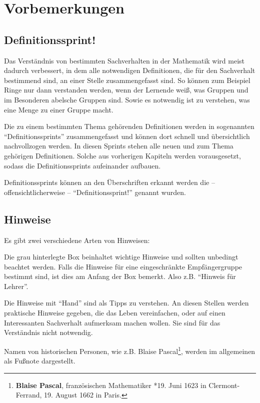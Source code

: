 \chapter{Vorbemerkungen}

\section{Definitionssprint!}

Das Verständnis von bestimmten Sachverhalten in der Mathematik wird meist dadurch verbessert, in dem alle notwendigen Definitionen, die für den Sachverhalt bestimmend sind, an einer Stelle zusammengefasst sind. So können zum Beispiel Ringe nur dann verstanden werden, wenn der Lernende weiß, was Gruppen und im Besonderen abelsche Gruppen sind. Sowie es notwendig ist zu verstehen, was eine Menge zu einer Gruppe macht. 

Die zu einem bestimmten Thema gehörenden Definitionen werden in sogenannten "`Definitionssprints"' zusammengefasst und können dort schnell und übersichtlich nachvollzogen werden. In diesen Sprints stehen alle neuen und zum Thema gehörigen Definitionen. Solche aus vorherigen Kapiteln werden vorausgesetzt, sodass die Definitionssprints aufeinander aufbauen.

Definitionssprints können an den Überschriften erkannt werden die -- offensichtlicherweise -- "`Definitionssprint!"' genannt wurden.

\section{Hinweise}

Es gibt zwei verschiedene Arten von Hinweisen: 

\begin{svgraybox}
Die grau hinterlegte Box beinhaltet wichtige Hinweise und sollten unbedingt beachtet werden. Falls die Hinweise für eine eingeschränkte Empfängergruppe bestimmt sind, ist dies am Anfang der Box bemerkt. Also z.B. "`Hinweis für Lehrer"'. 
\end{svgraybox}

\bigskip

\HandRight \qquad Die Hinweise mit "`Hand"' sind als Tipps zu verstehen. An diesen Stellen werden praktische Hinweise gegeben, die das Leben vereinfachen, oder auf einen Interessanten Sachverhalt aufmerksam machen wollen. Sie sind für das Verständnis nicht notwendig. 

\bigskip

Namen von historischen Personen, wie z.B. Blaise Pascal\footnote{\textbf{Blaise Pascal}, französischen Mathematiker *19. Juni 1623 in Clermont-Ferrand, 19. August 1662 in Paris.}, werden im allgemeinen als Fußnote dargestellt. 